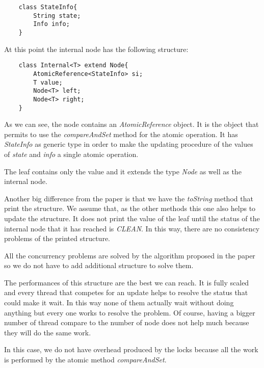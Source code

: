 \begin{lstlisting}
	class StateInfo{
		String state;
		Info info;	
	}
\end{lstlisting}

At this point the internal node has the following structure:\newline

\begin{lstlisting}
	class Internal<T> extend Node{
		AtomicReference<StateInfo> si;
		T value;
		Node<T> left;
		Node<T> right;	
	}
\end{lstlisting}

As we can see, the node contains an \emph{AtomicReference} object. It is the object that permits to use the \emph{compareAndSet} method for the atomic operation. It has \emph{StateInfo} as generic type in order to make the updating procedure of the values of \emph{state} and \emph{info} a single atomic operation.

The leaf contains only the value and it extends the type \emph{Node} as well as the internal node.\newline

Another big difference from the paper is that we have the \emph{toString} method that print the structure. We assume that, as the other methods  this one also helps to update the structure. It does not print the value of the leaf until the status of the internal node that it has reached is \emph{CLEAN}. In this way, there are no consistency problems of the printed structure.\newline

All the concurrency problems are solved by the algorithm proposed in the paper so we do not have to add additional structure to solve them. 


The performances of this structure are the best we can reach. It is fully scaled and every thread that competes for an update helps to resolve the status that could make it wait. In this way none of them actually wait without doing anything but every one works to resolve the problem. Of course, having a bigger number of thread compare to the number of node does not help much because they will do the same work. 

In this case, we do not have overhead produced by the locks because all the work is performed by the atomic method \emph{compareAndSet}.











